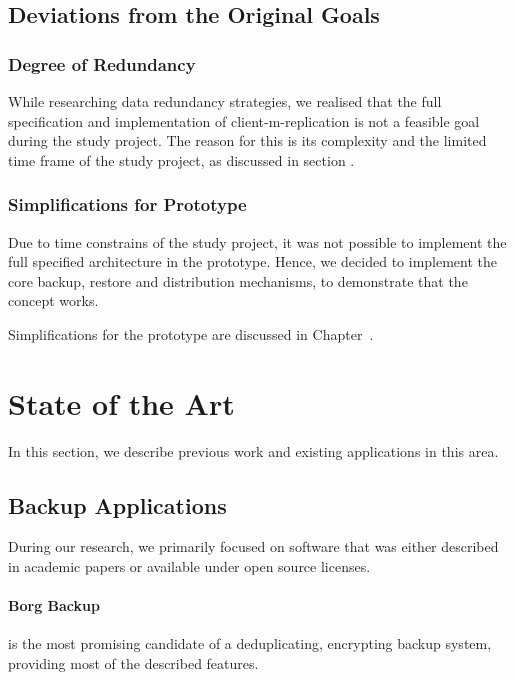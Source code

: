 \subsection{Deviations from the Original Goals}\label{sec:deviations-from-original-goals}

\subsubsection{Degree of Redundancy}
While researching data redundancy strategies, we realised that the full specification and implementation of \gls{client-m-replication} is not a feasible goal during the study project. The reason for this is its complexity and the limited time frame of the study project, as discussed in section .

\subsubsection{Simplifications for Prototype}
Due to time constrains of the study project, it was not possible to implement the full specified architecture in the prototype. Hence, we decided to implement the core backup, restore and distribution mechanisms, to demonstrate that the concept works.

Simplifications for the prototype are discussed in Chapter~.

\section{State of the Art}\label{sec:state-of-the-art}
In this section, we describe previous work and existing applications in this area.

\subsection{Backup Applications}
During our research, we primarily focused on software that was either described in academic papers or available under open source licenses.

\paragraph{Borg Backup} \cite{borg-backup} is the most promising candidate of a deduplicating, encrypting backup system, providing most of the described features.

